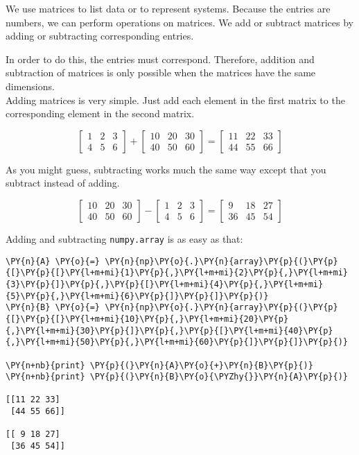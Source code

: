 We use matrices to list data or to represent systems. Because the
entries are numbers, we can perform operations on matrices. We add or
subtract matrices by adding or subtracting corresponding entries.

In order to do this, the entries must correspond. Therefore, addition
and subtraction of matrices is only possible when the matrices have the
same dimensions.\\
Adding matrices is very simple. Just add each element in the first
matrix to the corresponding element in the second matrix.

\[
\begin{bmatrix}
1 & 2 & 3 \\
4 & 5 & 6
\end{bmatrix}
+
\begin{bmatrix}
10 & 20 & 30\\
40 & 50 & 60
\end{bmatrix}
=
\begin{bmatrix}
11 & 22 & 33\\
44 & 55 & 66
\end{bmatrix}
\]

As you might guess, subtracting works much the same way except that you
subtract instead of adding.

\[
\begin{bmatrix}
10 & 20 & 30\\
40 & 50 & 60
\end{bmatrix}
-
\begin{bmatrix}
1 & 2 & 3 \\
4 & 5 & 6
\end{bmatrix}
=
\begin{bmatrix}
9 & 18 & 27\\
36 & 45 & 54
\end{bmatrix}
\]

Adding and subtracting \texttt{numpy.array} is as easy as that:

    \begin{tcolorbox}[breakable, size=fbox, boxrule=1pt, pad at break*=1mm,colback=cellbackground, colframe=cellborder]
\begin{Verbatim}[commandchars=\\\{\}]
\PY{n}{A} \PY{o}{=} \PY{n}{np}\PY{o}{.}\PY{n}{array}\PY{p}{(}\PY{p}{[}\PY{p}{[}\PY{l+m+mi}{1}\PY{p}{,}\PY{l+m+mi}{2}\PY{p}{,}\PY{l+m+mi}{3}\PY{p}{]}\PY{p}{,}\PY{p}{[}\PY{l+m+mi}{4}\PY{p}{,}\PY{l+m+mi}{5}\PY{p}{,}\PY{l+m+mi}{6}\PY{p}{]}\PY{p}{]}\PY{p}{)}
\PY{n}{B} \PY{o}{=} \PY{n}{np}\PY{o}{.}\PY{n}{array}\PY{p}{(}\PY{p}{[}\PY{p}{[}\PY{l+m+mi}{10}\PY{p}{,}\PY{l+m+mi}{20}\PY{p}{,}\PY{l+m+mi}{30}\PY{p}{]}\PY{p}{,}\PY{p}{[}\PY{l+m+mi}{40}\PY{p}{,}\PY{l+m+mi}{50}\PY{p}{,}\PY{l+m+mi}{60}\PY{p}{]}\PY{p}{]}\PY{p}{)}

\PY{n+nb}{print} \PY{p}{(}\PY{n}{A}\PY{o}{+}\PY{n}{B}\PY{p}{)}
\PY{n+nb}{print} \PY{p}{(}\PY{n}{B}\PY{o}{\PYZhy{}}\PY{n}{A}\PY{p}{)}

[[11 22 33]
 [44 55 66]]
 
[[ 9 18 27]
 [36 45 54]]
    \end{Verbatim}
\end{tcolorbox}

